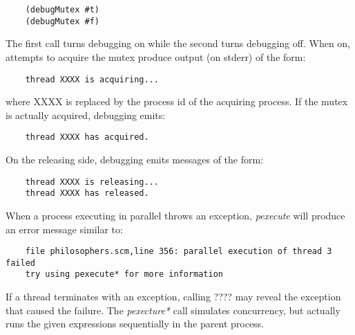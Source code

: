 \begin{verbatim}
    (debugMutex #t)
    (debugMutex #f)
\end{verbatim}

The first call turns debugging on while the second turns debugging off. When
on, attempts to acquire the mutex produce output (on stderr) of
the form:

\begin{verbatim}
    thread XXXX is acquiring...
\end{verbatim}

where XXXX is replaced by the process id of the acquiring process.
If the mutex is actually acquired, debugging emits:

\begin{verbatim}
    thread XXXX has acquired.
\end{verbatim}

On the releasing side, debugging emits messages of the form:

\begin{verbatim}
    thread XXXX is releasing...
    thread XXXX has released.
\end{verbatim}

When a process executing in parallel throws an exception, {\it pexecute} will
produce an error message similar to:

\begin{verbatim}
    file philosophers.scm,line 356: parallel execution of thread 3 failed
    try using pexecute* for more information
\end{verbatim}

If a thread terminates with an exception,
calling ???? may reveal the
exception that caused the failure.
The {\it pexecture*} call simulates concurrency, but actually runs the
given expressions sequentially in the parent process.

